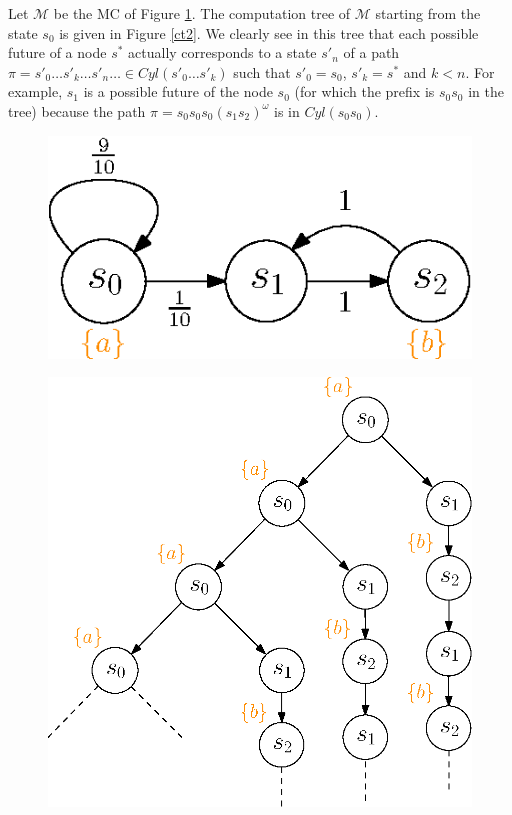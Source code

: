 \begin{example}
Let $\mathcal{M}$ be the MC of Figure \ref{ct1}. The computation tree of $\mathcal{M}$ starting from the state $s_0$ is
given in Figure \ref{ct2}. We clearly see in this tree that each possible future of a node $s^*$ actually corresponds to a state $s'_n$ of a path $\pi = s'_0 \dots s'_k \dots s'_n \dots \in Cyl(s'_0 \dots s'_k)$ such that $s'_0 = s_0$, $s'_k=s^*$ and $k < n$.
For example, $s_1$ is a possible future of the node $s_0$ (for which the prefix is $s_0s_0$ in the tree) because the path $\pi = s_0s_0s_0(s_1s_2)^\omega$ is in $Cyl(s_0s_0)$.
\begin{figure}[h]
  \begin{minipage}{0.4\linewidth}
    \centering
    \includegraphics[width=0.8\linewidth]{resources/CLT_unfolding_1}
    \captionsetup{justification=centering}
    \label{ct1}
  \end{minipage}
  \begin{minipage}{0.6\linewidth}
    \centering
    \includegraphics[width=0.8\linewidth]{resources/CLT_unfolding_2}

\end{minipage}
\end{figure}
\end{example}

